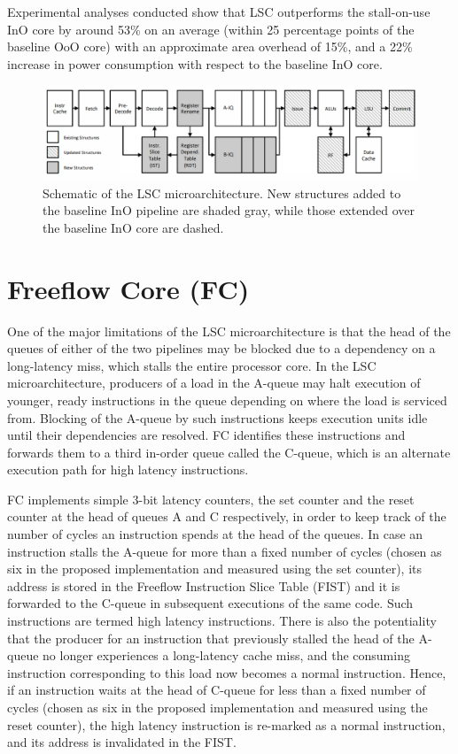 \documentclass[a4paper,12pt, final]{report}
\begin{document}
Experimental analyses conducted show that LSC outperforms the stall-on-use InO core by around 53\% on an average (within 25 percentage points of the baseline OoO core) with an approximate area overhead of 15\%, and a 22\% increase in power consumption with respect to the baseline InO core.

\begin{figure}[H]
    \begin{center}
    \includegraphics[width=\linewidth]{august22/img/lsc.png}
    \caption{Schematic of the LSC microarchitecture. New structures added to the baseline InO pipeline are shaded gray, while those extended over the baseline InO core are dashed.}
    \end{center}
\end{figure}

\section{Freeflow Core (FC)}

One of the major limitations of the LSC microarchitecture is that the head of the queues of either of the two pipelines may be blocked due to a dependency on a long-latency miss, which stalls the entire processor core. In the LSC microarchitecture, producers of a load in the A-queue may halt execution of younger, ready instructions in the queue depending on where the load is serviced from. Blocking of the A-queue by such instructions keeps execution units idle until their dependencies are resolved. FC identifies these instructions and forwards them to a third in-order queue called the C-queue, which is an alternate execution path for high latency instructions.

FC implements simple 3-bit latency counters, the set counter and the reset counter at the head of queues A and C respectively, in order to keep track of the number of cycles an instruction spends at the head of the queues. In case an instruction stalls the A-queue for more than a fixed number of cycles (chosen as six in the proposed implementation and measured using the set counter), its address is stored in the Freeflow Instruction Slice Table (FIST) and it is forwarded to the C-queue in subsequent executions of the same code. Such instructions are termed high latency instructions. There is also the potentiality that the producer for an instruction that previously stalled the head of the A-queue no longer experiences a long-latency cache miss, and the consuming instruction corresponding to this load now becomes a normal instruction. Hence, if an instruction waits at the head of C-queue for less than a fixed number of cycles (chosen as six in the proposed implementation and measured using the reset counter), the high latency instruction is re-marked as a normal instruction, and its address is invalidated in the FIST.
\end{document}
